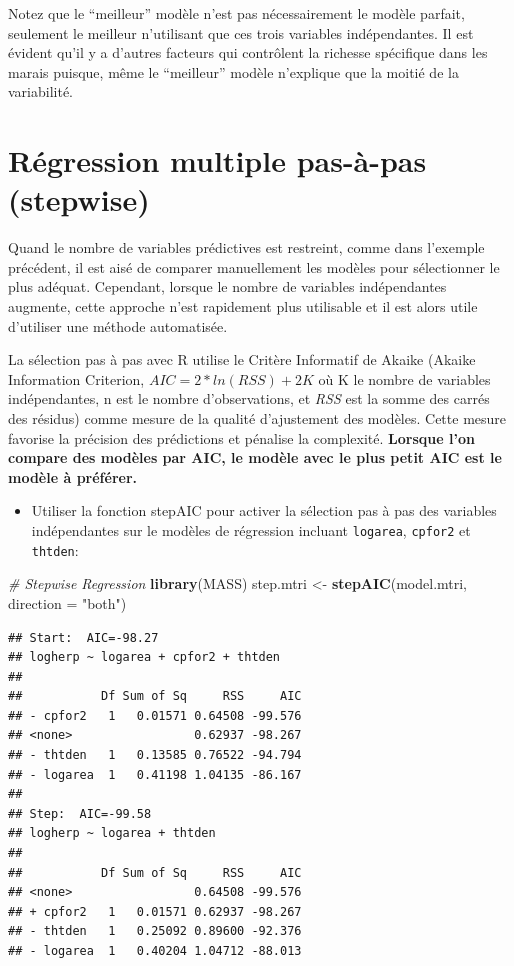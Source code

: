 \documentclass[
  12pt,
]{book}
\newenvironment{Shaded}{\begin{snugshade}}{\end{snugshade}}
\newcommand{\CommentTok}[1]{\textcolor[rgb]{0.56,0.35,0.01}{\textit{#1}}}
\newcommand{\DataTypeTok}[1]{\textcolor[rgb]{0.13,0.29,0.53}{#1}}
\newcommand{\KeywordTok}[1]{\textcolor[rgb]{0.13,0.29,0.53}{\textbf{#1}}}
\newcommand{\NormalTok}[1]{#1}
\newcommand{\StringTok}[1]{\textcolor[rgb]{0.31,0.60,0.02}{#1}}
\providecommand{\tightlist}{%
  \setlength{\itemsep}{0pt}\setlength{\parskip}{0pt}}
\begin{document}
Notez que le ``meilleur'' modèle n'est pas nécessairement le modèle parfait, seulement le meilleur n'utilisant que ces trois variables indépendantes. Il est évident qu'il y a d'autres facteurs qui contrôlent la richesse spécifique dans les marais puisque, même le ``meilleur'' modèle n'explique que la moitié de la variabilité.

\hypertarget{ruxe9gression-multiple-pas-uxe0-pas-stepwise}{%
\section{Régression multiple pas-à-pas (stepwise)}\label{ruxe9gression-multiple-pas-uxe0-pas-stepwise}}

Quand le nombre de variables prédictives est restreint, comme dans l'exemple précédent, il est aisé de comparer manuellement les modèles pour sélectionner le plus adéquat. Cependant, lorsque le nombre de variables indépendantes augmente, cette approche n'est rapidement plus utilisable et il est alors utile d'utiliser une méthode automatisée.

La sélection pas à pas avec R utilise le Critère Informatif de Akaike (Akaike Information Criterion, \(AIC = 2* ln(RSS) + 2K\) où K le nombre de variables indépendantes, n est le nombre d'observations, et \emph{RSS} est la somme des carrés des résidus) comme mesure de la qualité d'ajustement des modèles. Cette mesure favorise la précision des prédictions et pénalise la complexité. \textbf{Lorsque l'on compare des modèles par AIC, le modèle avec le plus petit AIC est le modèle à préférer.}

\begin{itemize}
\tightlist
\item
  Utiliser la fonction stepAIC pour activer la sélection pas à pas des variables indépendantes sur le modèles de régression incluant \texttt{logarea}, \texttt{cpfor2} et \texttt{thtden}:
\end{itemize}

\begin{Shaded}
\begin{Highlighting}[]
\CommentTok{\# Stepwise Regression}
\KeywordTok{library}\NormalTok{(MASS)}
\NormalTok{step.mtri \textless{}{-}}\StringTok{ }\KeywordTok{stepAIC}\NormalTok{(model.mtri, }\DataTypeTok{direction =} \StringTok{"both"}\NormalTok{)}
\end{Highlighting}
\end{Shaded}

\begin{verbatim}
## Start:  AIC=-98.27
## logherp ~ logarea + cpfor2 + thtden
## 
##           Df Sum of Sq     RSS     AIC
## - cpfor2   1   0.01571 0.64508 -99.576
## <none>                 0.62937 -98.267
## - thtden   1   0.13585 0.76522 -94.794
## - logarea  1   0.41198 1.04135 -86.167
## 
## Step:  AIC=-99.58
## logherp ~ logarea + thtden
## 
##           Df Sum of Sq     RSS     AIC
## <none>                 0.64508 -99.576
## + cpfor2   1   0.01571 0.62937 -98.267
## - thtden   1   0.25092 0.89600 -92.376
## - logarea  1   0.40204 1.04712 -88.013
\end{verbatim}
\end{document}
